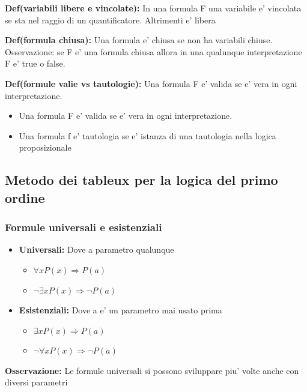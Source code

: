 \documentclass{article}
\begin{document}
        \begin{flushleft}
          \textbf{Def(variabili libere e vincolate):} In una formula F una variabile e' vincolata se sta nel raggio di un quantificatore. Altrimenti e' libera
        \end{flushleft}
        \begin{flushleft}
          \textbf{Def(formula chiusa):} Una formula e' chiusa se non ha variabili chiuse. \\ 
          Osservazione: se F e' una formula chiusa allora in una qualunque interpretazione F e' true o false.
        \end{flushleft}
        \begin{flushleft}
          \textbf{Def(formule valie vs tautologie):} Una formula F e' valida se e' vera in ogni interpretazione.  
          \begin{itemize}
            \item Una formula F e' valida se e' vera in ogni interpretazione. 
            \item Una formula f e' tautologia se e' istanza di una tautologia nella logica proposizionale 
          \end{itemize}
        \end{flushleft}
        \subsection{Metodo dei tableux per la logica del primo ordine}
         \subsubsection{Formule universali e esistenziali}
         \begin{itemize}
           \item \textbf{Universali:} Dove a parametro qualunque
             \begin{itemize}
               \item $\forall x P(x) \Rightarrow P(a)$
               \item $\neg \exists x P(x) \Rightarrow \neg P(a)$
             \end{itemize}
           \item \textbf{Esistenziali:} Dove a e' un parametro mai usato prima
             \begin{itemize}
               \item $\exists x P(x) \Rightarrow P(a)$
               \item $\neg \forall x P(x) \Rightarrow \neg P(a)$
             \end{itemize}
         \end{itemize}
         \begin{flushleft}
          \textbf{Osservazione:} Le formule universali si possono sviluppare piu' volte anche con diversi parametri
         \end{flushleft}
\end{document}
